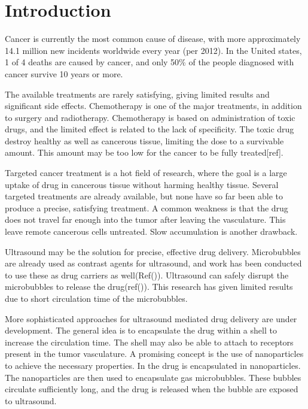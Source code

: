 \section{Introduction}

Cancer is currently the most common cause of disease, with more approximately 14.1 million new incidents worldwide every year (per 2012)\cite{cancer1}. In the United states, 1 of 4 deaths are caused by cancer\cite{Siegel2014}, and only 50\% of the people diagnosed with cancer survive 10 years or more. 

The available treatments are rarely satisfying, giving limited results and significant side effects. Chemotherapy is one of the major treatments, in addition to surgery and radiotherapy. Chemotherapy is based on administration of toxic drugs, and the limited effect is related to the lack of specificity. The toxic drug destroy healthy as well as cancerous tissue, limiting the dose to a survivable amount. This amount may be too low for the cancer to be fully treated[ref].

Targeted cancer treatment is a hot field of research, where the goal is a large uptake of drug in cancerous tissue without harming healthy tissue. Several targeted treatments are already available, but none have so far been able to produce a precise,  satisfying treatment. A common weakness is that the drug does not travel far enough into the tumor after leaving the vasculature. This leave remote cancerous cells untreated. Slow accumulation is another drawback. 

Ultrasound may be the solution for precise, effective drug delivery. Microbubbles are already used as contrast agents for ultrasound, and work has been conducted to use these as drug carriers as well(Ref(\cite{Ibsen2011})). Ultrasound can safely disrupt the microbubbles to release the drug(ref(\cite{Ibsen2011})). This research has given limited results due to short circulation time of the microbubbles. 

More sophisticated approaches for ultrasound mediated drug delivery are under development. The general idea is to encapsulate the drug within a shell to increase the circulation time. The shell may also be able to attach to receptors present in the tumor vasculature. A promising concept is the use of nanoparticles to achieve the necessary properties. In \cite{Eggen2013} the drug is encapsulated in nanoparticles. The nanoparticles are then used to encapsulate gas microbubbles. These bubbles circulate sufficiently long, and the drug is released when the bubble are exposed to ultrasound. 

